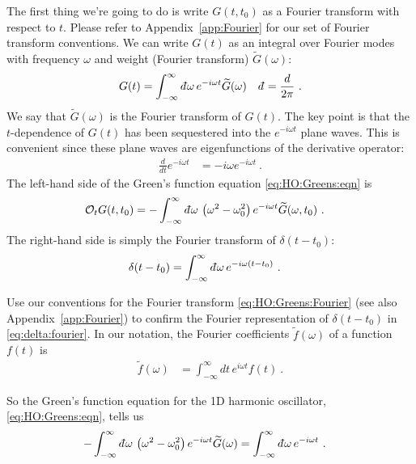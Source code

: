 The first thing we're going to do is write $G(t,t_0)$ as a Fourier transform with respect to $t$. Please refer to Appendix~\ref{app:Fourier} for our set of Fourier transform conventions. We can write $G(t)$ as an integral over Fourier modes with frequency $\omega$ and weight (Fourier transform) $\tilde G(\omega)$:
\begin{align}
	G(t) &= \int_{-\infty}^\infty\dbar \omega \, e^{-i\omega t} \tilde G(\omega) 
	&
	\dbar = \frac{d}{2\pi}
	\ .
	\label{eq:HO:Greens:Fourier}
\end{align}
We say that $\tilde G(\omega)$ is the Fourier transform of $G(t)$. The key point is that the $t$-dependence of $G(t)$ has been sequestered into the $e^{-i\omega t}$ plane waves. This is convenient since these plane waves are eigenfunctions of the derivative operator:
\begin{align}
	\frac{d}{dt} e^{-i\omega t} &= -i\omega e^{-i\omega t} \ .
\end{align}
The left-hand side of the Green's function equation \eqref{eq:HO:Greens:eqn} is
\begin{align}
	\mathcal O_t G(t,t_0) 
	&= 
	-
	\int_{-\infty}^\infty \dbar \omega \, 
	\left(\omega^2-\omega_0^2\right) e^{-i\omega t} \tilde G(\omega,t_0) \ .
\end{align}
The right-hand side is simply the Fourier transform of $\delta(t-t_0)$:
\begin{align}
	\delta(t-t_0)
	&=
	\int_{-\infty}^\infty \dbar \omega \, e^{-i\omega (t-t_0)} \ .
	\label{eq:delta:fourier}
\end{align}
\begin{exercise}
Use our conventions for the Fourier transform \eqref{eq:HO:Greens:Fourier} (see also Appendix~\ref{app:Fourier}) to confirm the Fourier representation of $\delta(t-t_0)$ in \eqref{eq:delta:fourier}. In our notation, the Fourier coefficients $\tilde f(\omega)$ of a function $f(t)$ is
\begin{align}
	\tilde f(\omega) &= 
	\int_{-\infty}^\infty d t\, e^{i\omega t} f(t) \ .
\end{align}
\end{exercise}
So the Green's function equation for the 1D harmonic oscillator, \eqref{eq:HO:Greens:eqn}, tells us
\begin{align}
	-
	\int_{-\infty}^\infty \dbar \omega \, 
	\left(\omega^2-\omega_0^2\right) e^{-i\omega t} \tilde G(\omega)
	&=
	\int_{-\infty}^\infty \dbar \omega \, e^{-i\omega t}
	\ .
	\label{eq:G:HO:Fourier:equation:integrals}
\end{align}
